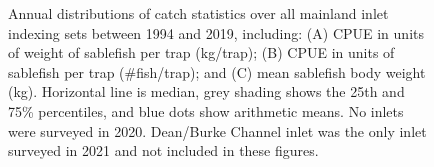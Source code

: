 \documentclass[12pt]{article}\usepackage[]{graphicx}\usepackage[]{color}
\begin{document}
\begin{figure}[htb]

{\centering {} 

}

\caption{Annual distributions of catch statistics over all mainland inlet indexing sets between 1994 and 2019, including: (A) CPUE in units of weight of sablefish per trap (kg/trap); (B) CPUE in units of sablefish per trap (\#fish/trap); and (C) mean sablefish body weight (kg). Horizontal line is median, grey shading shows the 25th and 75\% percentiles, and blue dots show arithmetic means. No inlets were surveyed in 2020. Dean/Burke Channel inlet was the only inlet surveyed in 2021 and not included in these figures.}\label{fig:figure11}
\end{figure}
\clearpage
\end{document}

